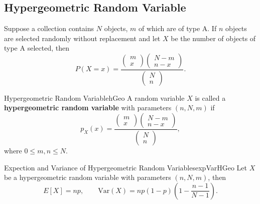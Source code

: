 \documentclass[math]{amznotes}
\theoremstyle{remark}
\begin{document}
\subsection{Hypergeometric Random Variable}
Suppose a collection contains $N$ objects, $m$ of which are of type A. If $n$ objects are selected randomly without replacement and let $X$ be the number of objects of type A selected, then 
\begin{equation*}
    P(X = x) = \frac{\begin{pmatrix}
        m \\
        x
    \end{pmatrix}\begin{pmatrix}
        N - m\\
        n - x
    \end{pmatrix}}{\begin{pmatrix}
        N \\
        n
    \end{pmatrix}}.
\end{equation*}
\begin{dfnbox}{Hypergeometric Random Variable}{hGeo}
    A random variable $X$ is called a {\color{red} \textbf{hypergeometric random variable}} with parameters $(n, N, m)$ if
    \begin{equation*}
        p_X(x) = \frac{\begin{pmatrix}
            m \\
            x
        \end{pmatrix}\begin{pmatrix}
            N - m\\
            n - x
        \end{pmatrix}}{\begin{pmatrix}
            N \\
            n
        \end{pmatrix}},
    \end{equation*}
    where $0 \leq m, n \leq N$.
\end{dfnbox}
\begin{thmbox}{\small Expection and Variance of Hypergeometric Random Variables}{expVarHGeo}
    Let $X$ be a hypergeometric random variable with parameters $(n, N, m)$, then
    \begin{equation*}
        E[X] = np, \qquad \mathrm{Var}(X) = np(1 - p)\left(1 - \frac{n - 1}{N - 1}\right).
    \end{equation*}
\end{thmbox}
\end{document}

